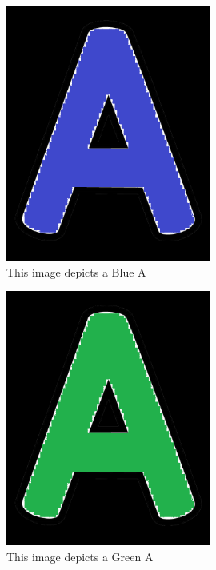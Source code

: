\documentclass[12pt, titlepage]{article}
\begin{document}
\begin{figure}[h!]
  \begin{center}
    \includegraphics[width=0.6\textwidth]{BlueA}
  \caption{This image depicts a Blue A}
  \label{Fig_blueA} 
  \end{center}
  \end{figure}

\begin{figure}[h!]
  \begin{center}
    \includegraphics[width=0.6\textwidth]{GreenA}
  \caption{This image depicts a Green A}
  \label{Fig_greenA} 
  \end{center}
  \end{figure}
\end{document}

